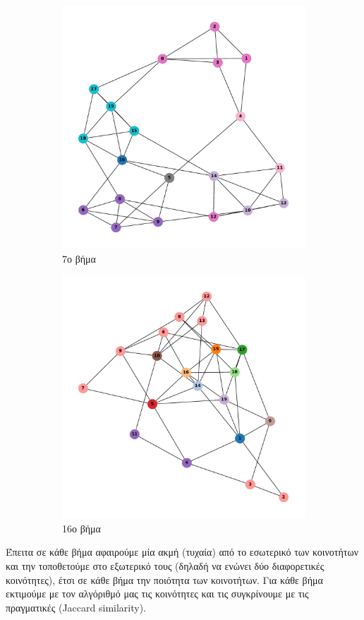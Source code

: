 \documentclass[10pt, letterpaper]{article}
\begin{document}
\begin{figure}[H]
  \begin{subfigure}{0.5\textwidth}
    \centering
    \includegraphics[width=0.6\linewidth]{iterations=6.pdf}
    \caption{7ο βήμα}
    \label{fig:it6}
  \end{subfigure}
  \begin{subfigure}{0.5\textwidth}
    \centering
    \includegraphics[width=0.6\linewidth]{iterations=15.pdf}
    \caption{16ο βήμα}
    \label{fig:it15}
  \end{subfigure}
  \caption{}
  \label{}
\end{figure}




Έπειτα σε κάθε βήμα αφαιρούμε μία ακμή (τυχαία) από το εσωτερικό των κοινοτήτων και την 
τοποθετούμε στο εξωτερικό τους (δηλαδή να ενώνει δύο διαφορετικές κοινότητες), έτσι 
 σε κάθε βήμα την ποιότητα των κοινοτήτων. Για κάθε βήμα εκτιμούμε με τον 
αλγόριθμό μας τις κοινότητες και τις συγκρίνουμε με τις πραγματικές (\textlatin{Jaccard similarity}).
\end{document}
